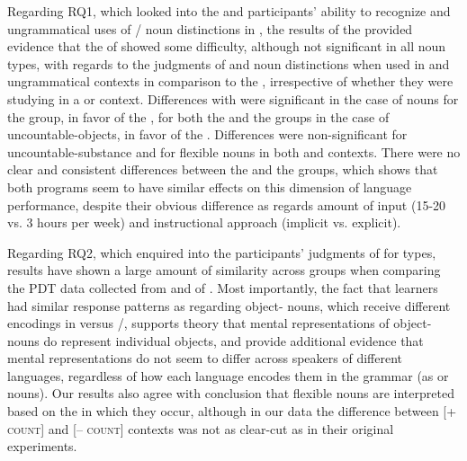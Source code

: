 \documentclass[output=paper]{langsci/langscibook}
\begin{document}
Regarding RQ1, which looked into the  and  participants’ ability to recognize  and ungrammatical uses of / noun distinctions in , the results of the  provided evidence that the  of  showed some difficulty, although not significant in all noun types, with regards to the judgments of  and  noun distinctions when used in  and ungrammatical contexts in comparison to the , irrespective of whether they were studying  in a  or  context. Differences with  were significant in the case of  nouns for the  group, in favor of the , for both the  and the  groups in the case of uncountable-objects, in favor of the . Differences were non-significant for uncountable-substance and for flexible nouns in both  and  contexts. There were no clear and consistent differences between the  and the  groups, which shows that both programs seem to have similar effects on this dimension of language performance, despite their obvious difference as regards amount of input (15-20 vs. 3 hours per week) and instructional approach (implicit vs. explicit).

  
Regarding RQ2, which enquired into the participants’ judgments of  for  types, results have shown a large amount of similarity across groups  when comparing the PDT data collected from  and  of . Most importantly, the fact that   learners had similar response patterns as  regarding object- nouns, which receive different  encodings in  versus /, supports  theory that mental representations of object- nouns do represent individual objects, and provide additional evidence that mental representations do not seem to differ across speakers of different languages, regardless of how each language encodes them in the grammar (as  or  nouns). Our results also agree with  conclusion that flexible nouns are interpreted based on the  in which they occur, although in our data the difference between [\textsc{+ count}] and [\textsc{– count}] contexts was not as clear-cut as in their original experiments. 
\end{document}
